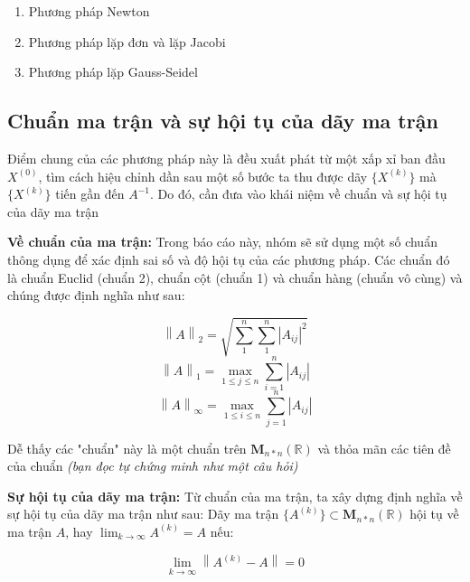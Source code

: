         \begin{enumerate}[label = (\roman*)]
            \item Phương pháp Newton
            \item Phương pháp lặp đơn và lặp Jacobi
            \item Phương pháp lặp Gauss-Seidel
        \end{enumerate}

    \subsection{Chuẩn ma trận và sự hội tụ của dãy ma trận}
        \par Điểm chung của các phương pháp này là đều xuất phát từ một xấp xỉ ban đầu $X^{(0)}$, tìm cách hiệu chỉnh dần sau một số bước ta thu được dãy  $ \{ X^{(k)} \} $ mà $ \{ X^{(k)} \} $ tiến gần đến $A^{-1}$. Do đó, cần đưa vào khái niệm về chuẩn và sự hội tụ của dãy ma trận
            
        \par \textbf{Về chuẩn của ma trận:} Trong báo cáo này, nhóm sẽ sử dụng một số chuẩn thông dụng để xác định sai số và độ hội tụ của các phương pháp. Các chuẩn đó là chuẩn Euclid (chuẩn 2), chuẩn cột (chuẩn 1) và chuẩn hàng (chuẩn vô cùng) và chúng được định nghĩa như sau:
        
        $$ \left\lVert A \right\rVert_{2} = \sqrt{ \sum\limits_{1}^{n} \sum\limits_{1}^{n} \left\lvert A_{ij} \right\rvert^{2}  }   $$
        $$ \left\lVert A \right\rVert_{1} = \max\limits_{1 \leq j \leq n} \sum\limits_{i = 1}^{n} \left\lvert A_{ij} \right\rvert    $$
        $$ \left\lVert A \right\rVert_{\infty} =  \max\limits_{1 \leq i \leq n} \sum\limits_{j = 1}^{n} \left\lvert A_{ij} \right\rvert $$

        Dễ thấy các "chuẩn" này là một chuẩn trên $ \mathbf{M}_{n*n} (\mathbb{R}) $ và thỏa mãn các tiên đề của chuẩn \textit{(bạn đọc tự chứng minh như một câu hỏi)}

        \par \textbf{Sự hội tụ của dãy ma trận:} Từ chuẩn của ma trận, ta xây dựng định nghĩa về sự hội tụ của dãy ma trận như sau: Dãy ma trận $ \{ A^{(k)} \} \subset \mathbf{M}_{n*n} (\mathbb{R}) $ hội tụ về ma trận $ A $, hay $ \lim_{k \to \infty} A^{(k)} = A $ nếu:

        $$ \lim_{k \to \infty} \left\lVert A^{(k)} - A \right\rVert = 0 $$


    